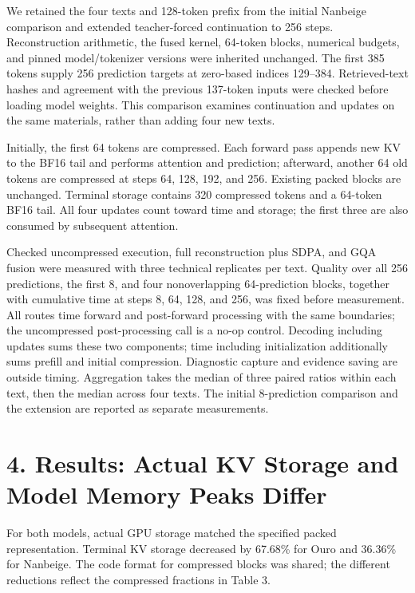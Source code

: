 \documentclass[10pt,a4paper]{article}
\begin{document}
We retained the four texts and 128-token prefix from the initial Nanbeige comparison and extended teacher-forced continuation to 256 steps. Reconstruction arithmetic, the fused kernel, 64-token blocks, numerical budgets, and pinned model/tokenizer versions were inherited unchanged. The first 385 tokens supply 256 prediction targets at zero-based indices 129--384. Retrieved-text hashes and agreement with the previous 137-token inputs were checked before loading model weights. This comparison examines continuation and updates on the same materials, rather than adding four new texts.

Initially, the first 64 tokens are compressed. Each forward pass appends new KV to the BF16 tail and performs attention and prediction; afterward, another 64 old tokens are compressed at steps 64, 128, 192, and 256. Existing packed blocks are unchanged. Terminal storage contains 320 compressed tokens and a 64-token BF16 tail. All four updates count toward time and storage; the first three are also consumed by subsequent attention.

Checked uncompressed execution, full reconstruction plus SDPA, and GQA fusion were measured with three technical replicates per text. Quality over all 256 predictions, the first 8, and four nonoverlapping 64-prediction blocks, together with cumulative time at steps 8, 64, 128, and 256, was fixed before measurement. All routes time forward and post-forward processing with the same boundaries; the uncompressed post-processing call is a no-op control. Decoding including updates sums these two components; time including initialization additionally sums prefill and initial compression. Diagnostic capture and evidence saving are outside timing. Aggregation takes the median of three paired ratios within each text, then the median across four texts. The initial 8-prediction comparison and the extension are reported as separate measurements.

\section{4. Results: Actual KV Storage and Model Memory Peaks Differ}\label{results-actual-kv-storage-and-model-memory-peaks-differ}

For both models, actual GPU storage matched the specified packed representation. Terminal KV storage decreased by 67.68\% for Ouro and 36.36\% for Nanbeige. The code format for compressed blocks was shared; the different reductions reflect the compressed fractions in Table 3.
\end{document}

